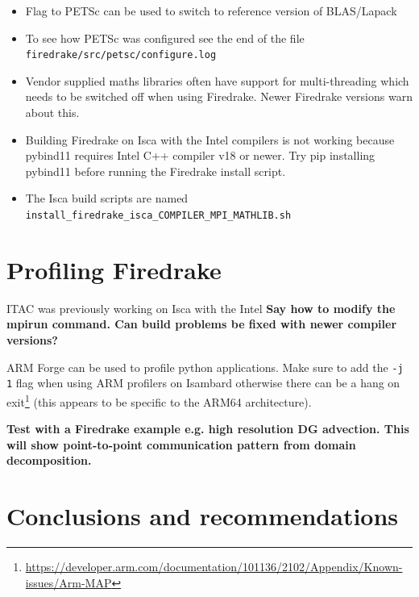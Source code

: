\documentclass[a4paper,titlepage]{article}
\begin{document}
\begin{itemize}
\item Flag to PETSc can be used to switch to reference version of BLAS/Lapack
\item To see how PETSc was configured see the end of the file \texttt{firedrake/src/petsc/configure.log}

\item Vendor supplied maths libraries often have support for multi-threading which needs to be switched off when using Firedrake. Newer Firedrake versions warn about this.

\item Building Firedrake on Isca with the Intel compilers is not working because pybind11 requires Intel C++ compiler v18 or newer. Try pip installing pybind11 before running the Firedrake install script.

\item The Isca build scripts are named \verb+install_firedrake_isca_COMPILER_MPI_MATHLIB.sh+
\end{itemize}


\section{Profiling Firedrake}
\label{section:profiling_firedrake}

ITAC was previously working on Isca with the Intel \textbf{Say how to modify the mpirun command. Can build problems be fixed with newer compiler versions?}

ARM Forge can be used to profile python applications. Make sure to add the \verb+-j 1+ flag when using ARM profilers on Isambard otherwise there can be a hang on exit\footnote{\url{https://developer.arm.com/documentation/101136/2102/Appendix/Known-issues/Arm-MAP}} (this appears to be specific to the ARM64 architecture).

\textbf{Test with a Firedrake example e.g. high resolution DG advection. This will show point-to-point communication pattern from domain decomposition.}


\section{Conclusions and recommendations}
\label{section:conclusions}
\end{document}
